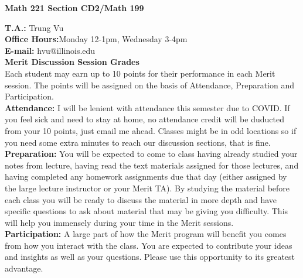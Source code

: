 \documentclass[12pt]{article}
\begin{document}
\begin{center}
\textbf{Math 221 Section CD2/Math 199}
\end{center}

\noindent \textbf{T.A.:} Trung Vu\\				
\textbf{Office Hours:}Monday 12-1pm, Wednesday 3-4pm\\
\textbf{E-mail:} hvu@illinois.edu\\

\noindent \textbf{Merit Discussion Session Grades}\\
Each student may earn up to 10 points for their performance in each Merit session. The points will be assigned on the basis of Attendance, Preparation and Participation.\\
\textbf{Attendance:} I will be lenient with attendance this semester due to COVID. If you feel sick and need to stay at home, no attendance credit will be duducted from  your 10 points, just email me ahead. Classes might be in odd locations so if you need some extra minutes to reach our discussion sections, that is fine.\\
\textbf{Preparation:} You will be expected to come to class having already studied your notes from lecture, having read the text materials assigned for those lectures, and having completed any homework assignments due that day (either assigned by the large lecture instructor or your Merit TA). By studying the material before each class you will be ready to discuss the material in more depth and have specific questions to ask about material that may be giving you difficulty. This will help you immensely during your time in the Merit sessions.\\
\textbf{Participation:}  A large part of how the Merit program will benefit you comes from how you interact with the class.  You are expected to contribute your ideas and insights as well as your questions.  Please use this opportunity to its greatest advantage.\\
\end{document}
